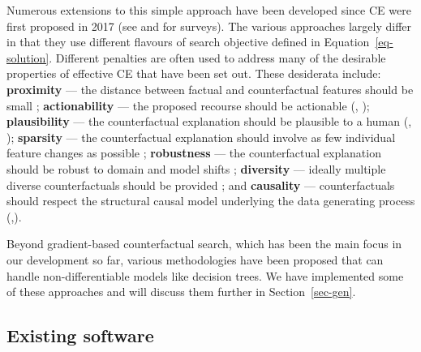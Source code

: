 \documentclass[
  letterpaper,
  DIV=11,
  numbers=noendperiod]{scrartcl}
\begin{document}
Numerous extensions to this simple approach have been developed since CE
were first proposed in 2017 (see \cite{verma2020counterfactual} and
\cite{karimi2020survey} for surveys). The various approaches largely
differ in that they use different flavours of search objective defined
in Equation~\ref{eq-solution}. Different penalties are often used to
address many of the desirable properties of effective CE that have been
set out. These desiderata include: \textbf{proximity} --- the distance
between factual and counterfactual features should be small
\cite{wachter2017counterfactual}; \textbf{actionability} --- the
proposed recourse should be actionable (\cite{ustun2019actionable},
\cite{poyiadzi2020face}); \textbf{plausibility} --- the counterfactual
explanation should be plausible to a human (\cite{joshi2019realistic},
\cite{schut2021generating}); \textbf{sparsity} --- the counterfactual
explanation should involve as few individual feature changes as possible
\cite{schut2021generating}; \textbf{robustness} --- the counterfactual
explanation should be robust to domain and model shifts
\cite{upadhyay2021robust}; \textbf{diversity} --- ideally multiple
diverse counterfactuals should be provided
\cite{mothilal2020explaining}; and \textbf{causality} ---
counterfactuals should respect the structural causal model underlying
the data generating process
(\cite{karimi2020algorithmic},\cite{karimi2021algorithmic}).

Beyond gradient-based counterfactual search, which has been the main
focus in our development so far, various methodologies have been
proposed that can handle non-differentiable models like decision trees.
We have implemented some of these approaches and will discuss them
further in Section~\ref{sec-gen}.

\hypertarget{existing-software}{%
\subsection{Existing software}\label{existing-software}}
\end{document}
